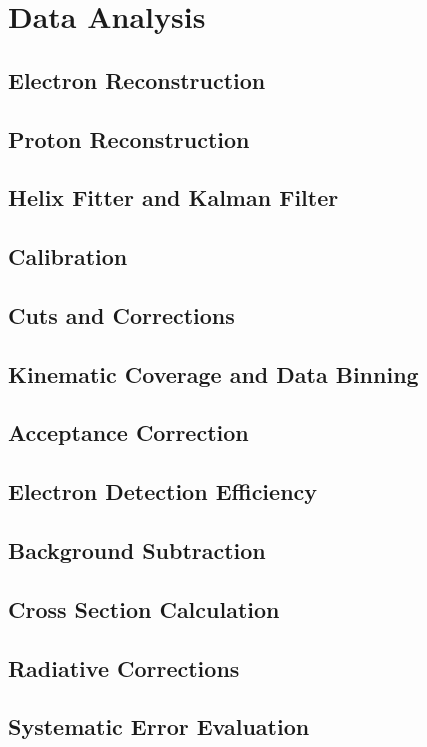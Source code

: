 \chapter{Data Analysis}
\label{ch:analysis}

\section{Electron Reconstruction}

\section{Proton Reconstruction}

\section{Helix Fitter and Kalman Filter}

\section{Calibration}

\section{Cuts and Corrections}

\section{Kinematic Coverage and Data Binning}

\section{Acceptance Correction}

\section{Electron Detection Efficiency}

\section{Background Subtraction}

\section{Cross Section Calculation}

\section{Radiative Corrections}

\section{Systematic Error Evaluation}






